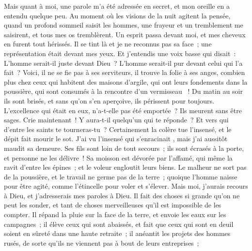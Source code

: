 \begin{multicols}{2}
Mais quant à moi, une parole m'a été adressée en secret, et mon oreille en a entendu quelque peu.
Au moment où les visions de la nuit agitent la pensée, quand un profond sommeil saisit les hommes,
une frayeur et un tremblement me saisirent, et tous mes os tremblèrent.
Un esprit passa devant moi, et mes cheveux en furent tout hérissés. 
Il se tint là et je ne reconnus pas sa face~; une représentation était devant mes yeux. Et j'entendis une voix basse qui disait~:
L'homme serait-il juste devant Dieu~? L'homme serait-il pur devant celui qui l'a fait~?
Voici, il ne se fie pas à ses serviteurs, il trouve la folie à ses anges,
combien plus chez ceux qui habitent des maisons d'argile, qui ont leurs fondements dans la poussière, qui sont consumés à la rencontre d'un vermisseau ~!
Du matin au soir ils sont brisés, et sans qu'on s'en aperçoive, ils périssent pour toujours. 
L'excellence qui était en eux, n'a-t-elle pas été emportée~? Ils meurent sans être sages. 
\VerseOne{}Crie maintenant~! Y aura-t-il quelqu'un qui te réponde~? Et vers qui d'entre les saints te tourneras-tu~?
Certainement la colère tue l'insensé, et le dépit fait mourir le sot.
J'ai vu l'insensé qui s'enracinait , mais j'ai aussitôt maudit sa demeure.
Ses fils sont loin de tout secours~; ils sont écrasés à la porte, et personne ne les délivre~!
Sa moisson est dévorée par l'affamé, qui même la ravit d'entre les épines~; et le voleur engloutit leurs biens.
Le malheur ne sort pas de la poussière, et le travail ne germe pas de la terre~;
quoique l'homme naisse pour être agité, comme l'étincelle pour voler et s'élever.
Mais moi, j'aurais recours à Dieu, et j'adresserais mes paroles à Dieu.
Il fait des choses si grande qu'on ne peut les sonder, et tant de choses merveilleuses qu'il est impossible de les compter.
Il répand la pluie sur la face de la terre, et envoie les eaux sur les campagnes~;
il élève ceux qui sont abaissés, et fait que ceux qui sont en deuil soient en sûreté dans une haute retraite~;
il anéantit les projets des hommes rusés, de sorte qu'ils ne viennent pas à bout de leurs entreprises~;

\end{multicols}
